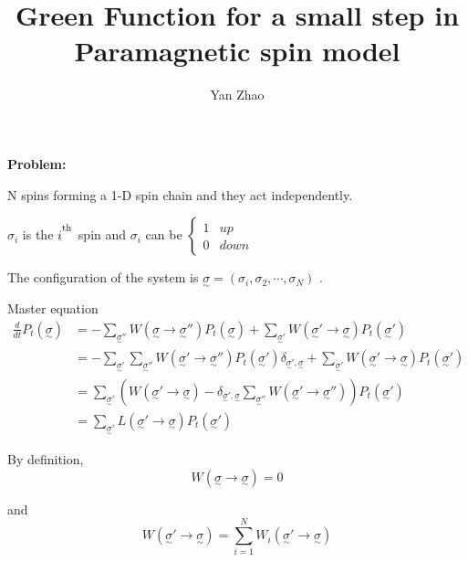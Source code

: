 \documentclass[letterpaper,12pt]{article}
\title{Green Function for a small step in Paramagnetic spin model}
\author{Yan Zhao}
\begin{document}
 
\maketitle 
\textbf{Problem:}  

N spins forming a 1-D spin chain and they act independently.

$\sigma_i$ is the $i^\textsuperscript{th}$ spin and $\sigma_i$ can be 
$\left\{
  \begin{array}{lcr}
     1& up\\
     0& down
  \end{array}
  \right.$
  
The configuration of the system is 
 $\underset{\sim}{\sigma}=(\sigma_i,\sigma_2 , \cdots ,\sigma_N) $ .
 
Master equation
\[
\left.
\begin{aligned}
 \frac{d}{dt}P_t(\underset{\sim}{\sigma})&=- \underset{\underset{\sim}{\sigma}''}{\sum} W(\underset{\sim}{\sigma}\rightarrow\underset{\sim}{\sigma}'') P_t(\underset{\sim}{\sigma}) + \underset{\underset{\sim}{\sigma}'}{\sum} W( \underset{\sim}{\sigma}' \rightarrow \underset{\sim}{\sigma}) P_t(\underset{\sim}{\sigma}') \\
 &=-\underset{\underset{\sim}{\sigma}'}{\sum}\underset{\underset{\sim}{\sigma}''}{\sum}W(\underset{\sim}{\sigma}'\rightarrow\underset{\sim}{\sigma}'') P_t(\underset{\sim}{\sigma}')\delta_{\underset{\sim}{\sigma}',\underset{\sim}{\sigma}} + \underset{\underset{\sim}{\sigma}'}{\sum} W( \underset{\sim}{\sigma}' \rightarrow \underset{\sim}{\sigma}) P_t(\underset{\sim}{\sigma}')\\
 &=\underset{\underset{\sim}{\sigma}'}{\sum} \left( W( \underset{\sim}{\sigma}' \rightarrow \underset{\sim}{\sigma})-\delta_{\underset{\sim}{\sigma}',\underset{\sim}{\sigma}}\underset{\underset{\sim}{\sigma}''}{\sum}W(\underset{\sim}{\sigma}'\rightarrow\underset{\sim}{\sigma}'') \right) P_t(\underset{\sim}{\sigma}')\\
 &=\underset{\underset{\sim}{\sigma}'}{\sum} L(\underset{\sim}{\sigma}'\rightarrow\underset{\sim}{\sigma})P_t(\underset{\sim}{\sigma}') 
\end{aligned}
\right. 
\] 

By definition, 
\[
W( \underset{\sim}{\sigma} \rightarrow \underset{\sim}{\sigma})=0 \label {1}\tag{1}
\]

and 
\[
W( \underset{\sim}{\sigma}' \rightarrow \underset{\sim}{\sigma})=\sum\limits_{i=1}^N W_i(\underset{\sim}{\sigma}' \rightarrow \underset{\sim}{\sigma}) \label {2}\tag{2}
\]
\end{document}
